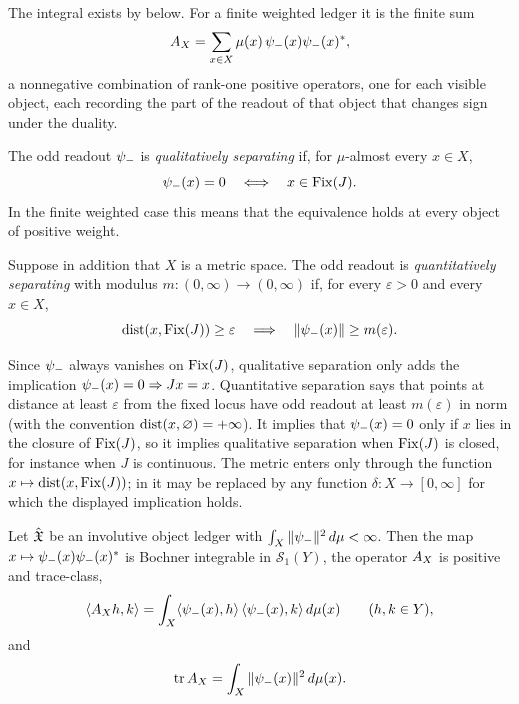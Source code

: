 The integral exists by 
below.  For a finite weighted ledger it is the finite sum
\[
  A_{X}=\sum_{x\in X}\mu(x)\,\psi_{-}(x)\psi_{-}(x)^*,
\]
a nonnegative combination of rank-one positive operators, one for each
visible object, each recording the part of the readout of that object
that changes sign under the duality.

\begin{definition}
\label{def:duality_confinement:separating-readout}
The odd readout \(\psi_{-}\) is \emph{qualitatively separating} if, for
\(\mu\)-almost every \(x\in X\),
\[
  \psi_{-}(x)=0
  \quad\Longleftrightarrow\quad
  x\in\operatorname{Fix}(J).
\]
In the finite weighted case this means that the equivalence holds at
every object of positive weight.

Suppose in addition that \(X\) is a metric space.  The odd readout is
\emph{quantitatively separating} with modulus
\(m:(0,\infty)\to(0,\infty)\) if, for every \(\varepsilon>0\) and every
\(x\in X\),
\[
  \operatorname{dist}(x,\operatorname{Fix}(J))\geq\varepsilon
  \quad\Longrightarrow\quad
  \|\psi_{-}(x)\|\geq m(\varepsilon).
\]
\end{definition}

Since \(\psi_{-}\) always vanishes on \(\operatorname{Fix}(J)\), qualitative separation
only adds the implication \(\psi_{-}(x)=0\Rightarrow Jx=x\).  Quantitative
separation says that points at distance at least \(\varepsilon\) from the
fixed locus have odd readout at least \(m(\varepsilon)\) in norm
(with the convention \(\operatorname{dist}(x,\varnothing)=+\infty\)).  It implies
that \(\psi_{-}(x)=0\) only if \(x\) lies in the closure of \(\operatorname{Fix}(J)\), so
it implies qualitative separation when \(\operatorname{Fix}(J)\) is closed, for
instance when \(J\) is continuous.  The metric enters only through the function \(x\mapsto\operatorname{dist}(x,\operatorname{Fix}(J))\);
in  it may be
replaced by any function \(\delta:X\to[0,\infty]\) for which the
displayed implication holds.

\begin{lemma}
\label{lem:duality_confinement:trace-identity}
Let \(\hat{\mathfrak{X}}\) be an involutive object ledger with
\(\int_X\|\psi_{-}\|^2\,d\mu<\infty\).  Then the map
\(x\mapsto\psi_{-}(x)\psi_{-}(x)^*\) is Bochner integrable in
\(\mathcal S_1(Y)\), the operator \(A_{X}\) is positive and trace-class,
\[
  \langle A_{X} h,k\rangle=\int_X\langle\psi_{-}(x),h\rangle\,
  \langle\psi_{-}(x),k\rangle\,d\mu(x)\qquad(h,k\in Y),
\]
and
\[
  \operatorname{tr}A_{X}=\int_X\|\psi_{-}(x)\|^2\,d\mu(x).
\]
\end{lemma}

